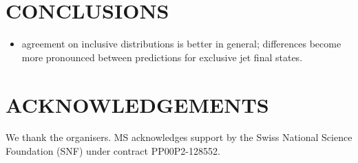 \section{CONCLUSIONS}
\label{sec:hjetscomp:conclusions}


\begin{itemize}
\item agreement on inclusive distributions is better in general;
  differences become more pronounced between predictions for exclusive
  jet final states. 
\end{itemize}


\section*{ACKNOWLEDGEMENTS}

We thank the organisers.
MS acknowledges support by the Swiss National Science Foundation (SNF) 
under contract PP00P2-128552.